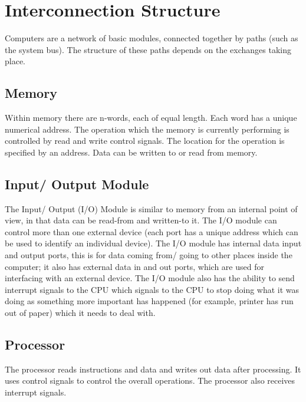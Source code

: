 
\section*{Interconnection Structure}
Computers are a network of basic modules, connected together by paths (such as the system bus). The structure of these paths depends on the exchanges taking place.

\subsection*{Memory}
Within memory there are n-words, each of equal length. Each word has a unique numerical address. The operation which the memory is currently performing is controlled by read and write control signals. The location for the operation is specified by an address. Data can be written to or read from memory.

\subsection*{Input/ Output Module}
The Input/ Output (I/O) Module is similar to memory from an internal point of view, in that data can be read-from and written-to it. The I/O module can control more than one external device (each port has a unique address which can be used to identify an individual device). The I/O module has internal data input and output ports, this is for data coming from/ going to other places inside the computer; it also has external data in and out ports, which are used for interfacing with an external device. The I/O module also has the ability to send interrupt signals to the CPU which signals to the CPU to stop doing what it was doing as something more important has happened (for example, printer has run out of paper) which it needs to deal with.

\subsection*{Processor}
The processor reads instructions and data and writes out data after processing. It uses control signals to control the overall operations. The processor also receives interrupt signals.

